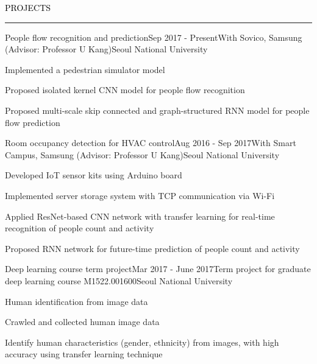 \documentclass{resume} %
\renewenvironment{rSection}[1]{
	\sectionskip
	\textcolor{Black}{\MakeUppercase{#1}}
	\sectionlineskip
	\hrule
	\begin{list}{}{
			\setlength{\leftmargin}{1.5em}
		}
		\item[]
	}{
	\end{list}
}
\begin{document}

\begin{rSection}{Projects}
	\begin{rSubsection}{People flow recognition and prediction}{Sep 2017 - Present}{With Sovico, Samsung (Advisor: Professor U Kang)}{Seoul National University}
		\item Implemented a pedestrian simulator model
		\item Proposed isolated kernel CNN model for people flow recognition
		\item Proposed multi-scale skip connected and graph-structured RNN model for people flow prediction
	\end{rSubsection}	
	\begin{rSubsection}{Room occupancy detection for HVAC control}{Aug 2016 - Sep 2017}{With Smart Campus, Samsung (Advisor: Professor U Kang)}{Seoul National University}
		\item Developed IoT sensor kits using Arduino board
		\item Implemented server storage system with TCP communication via Wi-Fi
		\item Applied ResNet-based CNN network with transfer learning for real-time recognition of people count and activity
		\item Proposed RNN network for future-time prediction of people count and activity
	\end{rSubsection}	
	\begin{rSubsection}{Deep learning course term project}{Mar 2017 - June 2017}{Term project for graduate deep learning course M1522.001600}{Seoul National University}
		\item Human identification from image data
		\item Crawled and collected human image data
		\item Identify human characteristics (gender, ethnicity) from images, with high accuracy using transfer learning technique
	\end{rSubsection}
	
\end{rSection}

	
\end{document}
